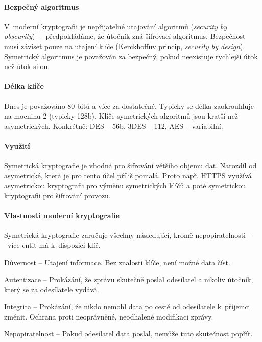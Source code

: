 \paragraph*{Bezpečný algoritmus} V~moderní kryptografii je nepřijatelné utajování algoritmů (\textit{security by obscurity})~--~předpokládáme, že útočník zná šifrovací algoritmus. Bezpečnost musí záviset pouze na utajení klíče (Kerckhoffuv princip, \textit{security by design}). Symetrický algoritmus je považován za bezpečný, pokud neexistuje rychlejší útok než útok silou.

\paragraph*{Délka klíče} Dnes je považováno 80 bitů a více za dostatečné. Typicky se délka zaokrouhluje na mocninu 2 (typicky 128b). Klíče symetrických algoritmů jsou kratší než asymetrických. Konkrétně: DES -- 56b, 3DES -- 112, AES -- variabilní.

\paragraph*{Využití} Symetrická kryptografie je vhodná pro šifrování většího objemu dat. Narozdíl od asymetrické, která je pro tento účel příliš pomalá. Proto např. HTTPS využívá asymetrickou kryptografii pro výměnu symetrických klíčů a poté symetrickou kryptografii pro šifrování provozu.

\paragraph*{Vlastnosti moderní kryptografie} Symetrická kryptografie zaručuje všechny následující, kromě nepopiratelnosti~--~více entit má k~dispozici klíč. \begin{compactitem}
    \item Důvernost -- Utajení informace. Bez znalosti klíče, není možné data číst.

    \item Autentizace -- Prokázání, že zprávu skutečně poslal odesílatel a nikoliv útočník, který se za odesílatele vydává.

    \item Integrita -- Prokázání, že nikdo nemohl data po cestě od odesílatele k~příjemci změnit. Ochrana proti neoprávněné, neodhalené modifikaci zprávy.

    \item Nepopiratelnost -- Pokud odesílatel data poslal, nemůže tuto skutečnost popřít.
\end{compactitem}

